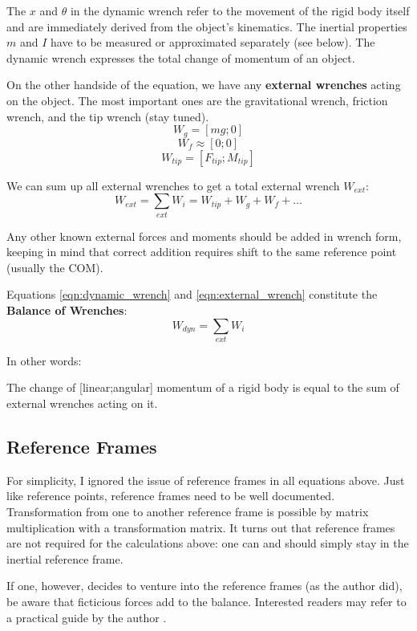 The \(x\) and \(\theta\) in the dynamic wrench refer to the movement of the rigid body itself and are immediately derived from the object's kinematics.
The inertial properties \(m\) and \(I\) have to be measured or approximated separately (see below).
The dynamic wrench expresses the total change of momentum of an object.


On the other handside of the equation, we have any \textbf{external wrenches} acting on the object.
The most important ones are the gravitational wrench, friction wrench, and the tip wrench (stay tuned).
\[W_{g} = \left[ mg; 0 \right]\]
\[W_{f} \approx \left[ 0; 0 \right]\]
\[W_{tip} = \left[ F_{tip}; M_{tip} \right]\]

We can sum up all external wrenches to get a total external wrench \(W_{ext}\):
\begin{equation}\label{eqn:external_wrench}
W_{ext} = \sum\limits_{ext} W_{i} = W_{tip} +W_{g}+W_{f}+\ldots
\end{equation}

Any other known external forces and moments should be added in wrench form, keeping in mind that correct addition requires shift to the same reference point (usually the COM).


Equations \eqref{eqn:dynamic_wrench} and \eqref{eqn:external_wrench} constitute the \textbf{Balance of Wrenches}:
\begin{equation}\label{eqn:balance_of_wrenches}
W_{dyn} = \sum\limits_{ext} W_{i}
\end{equation}

In other words:
\begin{center}
The change of [linear;angular] momentum of a rigid body is equal to the sum of external wrenches acting on it.
\end{center}


\subsection{Reference Frames}
\label{sec:orgff4030a}

For simplicity, I ignored the issue of reference frames in all equations above.
Just like reference points, reference frames need to be well documented.
Transformation from one to another reference frame is possible by matrix multiplication with a transformation matrix.
It turns out that reference frames are not required for the calculations above: one can and should simply stay in the inertial reference frame.

If one, however, decides to venture into the reference frames (as the author did), be aware that ficticious forces add to the balance.
Interested readers may refer to a practical guide by the author \citep{Mielke2020wrenches}.


